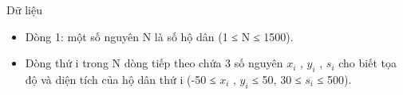 Dữ liệu
\begin{itemize}
	\item     Dòng 1: một số nguyên N là số hộ dân (1 ≤ N ≤ 1500).   
	\item     Dòng thứ i trong N dòng tiếp theo chứa 3 số nguyên $x_{i}$    , $y_{i}$    , $s_{i}$    cho biết tọa độ và diện tích của hộ dân thứ i (-50 ≤ $x_{i}$    , $y_{i}$    ≤ 50, 30 ≤ $s_{i}$    ≤ 500).   
\end{itemize}